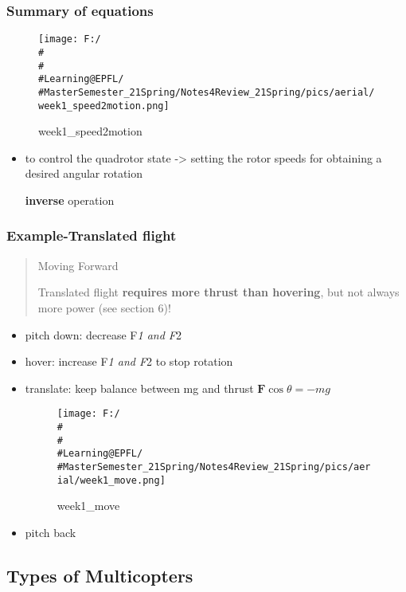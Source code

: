 \documentclass[]{article}
\begin{document}
\subsubsection{Summary of equations}\label{header-n289}

\begin{figure}
\centering
\texttt{[image: F:/\\\#\\\#\\\#Learning@EPFL/\\\#MasterSemester\_21Spring/Notes4Review\_21Spring/pics/aerial/week1\_speed2motion.png]}
\caption{week1\_speed2motion}
\end{figure}

\begin{itemize}
\item
  to control the quadrotor state -\textgreater{} setting the rotor
  speeds for obtaining a desired angular rotation

  \textbf{inverse} operation
\end{itemize}

\subsubsection{Example-Translated flight}\label{header-n295}

\begin{quote}
Moving Forward

Translated flight \textbf{requires more thrust than hovering}, but not
always more power (see section 6)!
\end{quote}

\begin{itemize}
\item
  pitch down: decrease F\emph{1 and F}2
\item
  hover: increase F\emph{1 and F}2 to stop rotation
\item
  translate: keep balance between mg and thrust
  \(\mathbf{F} \cos \theta=-m g\)

  \begin{figure}
  \centering
  \texttt{[image: F:/\\\#\\\#\\\#Learning@EPFL/\\\#MasterSemester\_21Spring/Notes4Review\_21Spring/pics/aerial/week1\_move.png]}
  \caption{week1\_move}
  \end{figure}
\item
  pitch back
\end{itemize}

\subsection{Types of Multicopters}\label{header-n309}
\end{document}
